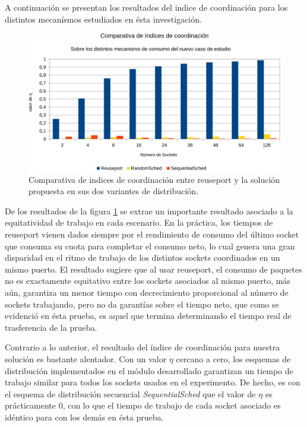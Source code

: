 A continuación se presentan los resultados del indice de coordinación para los distintos mecanísmos estudiados en ésta investigación.

\begin{figure}[!h]
	\centering
	\includegraphics[scale=.6]{resultados/tiempodelta-crop.pdf}
	\caption{Comparativa de indices de coordinación entre reuseport y la solución propuesta en sus dos variantes de distribución.}
	\label{fig:tiemposdelta}
\end{figure}

De los resultados de la figura \ref{fig:tiemposdelta} se extrae un importante resultado asociado a la equitatividad de trabajo en cada escenario. En la práctica, los tiempos de reuseport vienen dados siempre por el rendimiento de consumo del último socket que consuma su cuota para completar el consumo neto, lo cual genera una gran disparidad en el ritmo de trabajo de los distintos sockets coordinados en un mismo puerto. El resultado sugiere que al usar reuseport, el consumo de paquetes no es exactamente equitativo entre los sockets asociados al mismo puerto, más aún, garantiza un menor tiempo con decrecimiento proporcional al número de sockets trabajando, pero no da garantías sobre el tiempo neto, que como se evidenció en ésta prueba, es aquel que termina determinando el tiempo real de trasferencia de la prueba.

Contrario a lo anterior, el resultado del índice de coordinación para nuestra solución es bastante alentador. Con un valor $\eta$ cercano a cero, los esquemas de distribución implementados en el módulo desarrollado garantizan un tiempo de trabajo similar para todos los sockets usados en el experimento. De hecho, es con el esquema de distribución secuencial \emph{SequentialSched} que el valor de $\eta$ es prácticamente 0, con lo que el tiempo de trabajo de cada socket asociado es idéntico para con los demás en ésta prueba.


